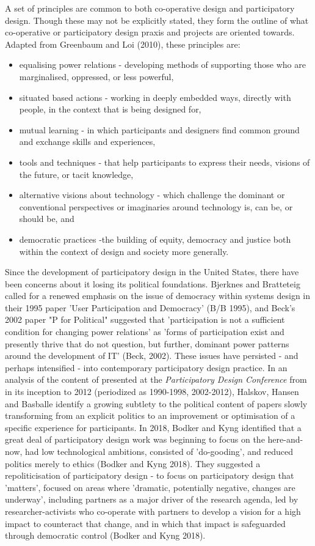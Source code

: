 A set of principles are common to both co-operative design and participatory design. Though these may not be explicitly stated, they form the outline of what co-operative or participatory design praxis and projects are oriented towards. Adapted from Greenbaum and Loi (2010), these principles are:
\begin{itemize}
\item equalising power relations - developing methods of supporting those who are marginalised, oppressed, or less powerful,
\item situated based actions - working in deeply embedded ways, directly with people, in the context that is being designed for,
\item mutual learning - in which participants and designers find common ground and exchange skills and experiences,
\item tools and techniques - that help participants to express their needs, visions of the future, or tacit knowledge,
\item alternative visions about technology - which challenge the dominant or conventional perspectives or imaginaries around technology is, can be, or should be, and
\item democratic practices -the building of equity, democracy and justice both within the context of design and society more generally.
\end{itemize}

Since the development of participatory design in the United States, there have been concerns about it losing its political foundations. Bjerknes and Bratteteig called for a renewed emphasis on the issue of democracy within systems design in their 1995 paper 'User Participation and Democracy' (B/B 1995), and Beck's 2002 paper "P for Political" suggested that 'participation is not a sufficient condition for changing power relations' as 'forms of participation exist and presently thrive that do not question, but further, dominant power patterns around the development of IT' (Beck, 2002). These issues have persisted - and perhaps intensified - into contemporary participatory design practice. In an analysis of the content of presented at the \textit{Participatory Design Conference} from in its inception to 2012 (periodized as 1990-1998, 2002-2012)\cite{halskov_diversity_2015, basballe_early_2016}, Halskov, Hansen and Basballe identify a growing subtlety to the political content of papers  slowly transforming from an explicit politics to an improvement or optimisation of a specific experience for participants. In 2018, Bodker and Kyng identified that a great deal of participatory design work was beginning to focus on the here-and-now, had low technological ambitions, consisted of 'do-gooding', and reduced politics merely to ethics (Bodker and Kyng 2018). They suggested a repoliticisation of participatory design - to focus on participatory design that 'matters', focused on areas where 'dramatic, potentially negative, changes are underway', including partners as a major driver of the research agenda, led by researcher-activists who co-operate with partners to develop a vision for a high impact to counteract that change, and in which that impact is safeguarded through democratic control (Bodker and Kyng 2018). 

